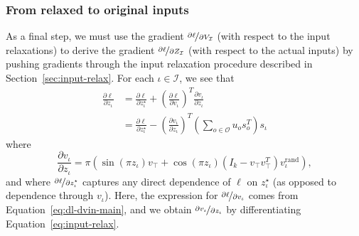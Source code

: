 \documentclass{article}
\newcommand{\inndex}{\iota}
\newcommand{\outdex}{o}
\newcommand{\truthvar}{\top}
\newcommand{\inset}{\mathcal{I}}
\newcommand{\outset}{\mathcal{O}}
\begin{document}
	\subsubsection{From relaxed to original inputs}
	
	As a final step, we must use the gradient $\nicefrac{\partial \ell}{\partial V_{\inset}}$ (with respect to the input relaxations) to derive the gradient $\nicefrac{\partial \ell}{\partial Z_{\inset}}$ (with respect to the actual inputs) by pushing gradients through the input relaxation procedure described in Section~\ref{sec:input-relax}.
	For each $\inndex \in \inset$, we see that
	\begin{equation}
		\begin{aligned}
			\frac{\partial \ell}{\partial z_{\inndex}} &= \frac{\partial \ell}{\partial z_{\inndex}^{\star}} + \left(\frac{\partial \ell}{\partial v_{\inndex}}  \right)^T \frac{\partial v_{\inndex}}{\partial z_{\inndex}} \\
			&= \frac{\partial \ell}{\partial z_{\inndex}^{\star}} -  \left(\frac{\partial v_{\inndex}}{\partial z_{\inndex}} \right)^T \left(\sum_{\outdex \in \outset} u_{\outdex} s_{\outdex}^T \right) s_{\inndex}
		\end{aligned}
		\label{eq:dl-dzin}
	\end{equation}
	where
	\begin{equation}
			\frac{\partial v_{\inndex}}{\partial z_{\inndex}} = 
			\pi\left(\sin (\pi z_{\inndex})v_{\truthvar} + \cos (\pi z_{\inndex}) (I_k - v_{\truthvar} v_{\truthvar}^T) v_{\inndex}^{\text{rand}} \right),
	\label{eq:dv-dz}
	\end{equation}
	and where $\nicefrac{\partial \ell}{\partial z_{\inndex}^{\star}}$ captures any direct dependence of $\ell$ on $z_{\inndex}^{\star}$ (as opposed to dependence through $v_{\inndex}$).
	Here, the expression for $\nicefrac{\partial \ell}{\partial v_{\inndex}}$ comes from Equation~\eqref{eq:dl-dvin-main}, and we obtain $\nicefrac{\partial v_{\inndex}}{\partial z_{\inndex}}$ by differentiating Equation~\eqref{eq:input-relax}.
\end{document}
